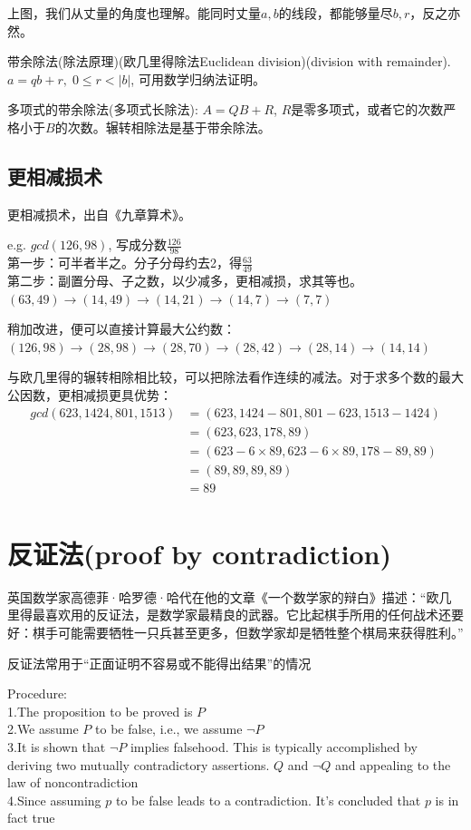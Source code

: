 \documentclass[../main.tex]{subfiles}
\begin{document}
上图，我们从丈量的角度也理解。能同时丈量$a,b$的线段，都能够量尽$b,r$，反之亦然。

带余除法(除法原理)(欧几里得除法Euclidean division)(division with remainder). $a=qb+r, \; 0\le r <|b|$, 可用数学归纳法证明。

多项式的带余除法(多项式长除法): $A=QB+R$, $R$是零多项式，或者它的次数严格小于$B$的次数。辗转相除法是基于带余除法。
\subsection{更相减损术}
更相减损术，出自《九章算术》。

e.g. $gcd(126, 98)$, 写成分数$\frac{126}{98}$\\
第一步：可半者半之。分子分母约去2，得$\frac{63}{49}$\\
第二步：副置分母、子之数，以少减多，更相减损，求其等也。\\
$(63,49) \rightarrow (14, 49)\rightarrow (14,21) \rightarrow (14,7) \rightarrow (7,7)$

稍加改进，便可以直接计算最大公约数：\\
$(126, 98) \rightarrow (28,98) \rightarrow (28,70)\rightarrow (28,42) \rightarrow (28,14) \rightarrow (14,14)$

与欧几里得的辗转相除相比较，可以把除法看作连续的减法。对于求多个数的最大公因数，更相减损更具优势：
\begin{align*}
  gcd(623, 1424, 801, 1513) &= (623, 1424-801, 801-623, 1513-1424)\\
                            &=(623, 623, 178, 89)\\
                            &= (623-6\times 89, 623 -6\times 89, 178-89, 89)\\
                            &=(89, 89, 89, 89)\\
                            &=89\\
\end{align*}

\section{反证法(proof by contradiction)}
英国数学家高德菲·哈罗德·哈代在他的文章《一个数学家的辩白》描述：“欧几里得最喜欢用的反证法，是数学家最精良的武器。它比起棋手所用的任何战术还要好：棋手可能需要牺牲一只兵甚至更多，但数学家却是牺牲整个棋局来获得胜利。”

反证法常用于“正面证明不容易或不能得出结果”的情况

Procedure:\\
1.The proposition to be proved is $P$\\
2.We assume $P$ to be false, i.e., we assume $\neg P$\\
3.It is shown that $\neg P$ implies falsehood. This is typically accomplished by deriving two mutually contradictory assertions. $Q$ and $\neg Q$ and appealing to the law of noncontradiction\\
4.Since assuming $p$ to be false leads to a contradiction. It's concluded that $p$ is in fact true
\end{document}

